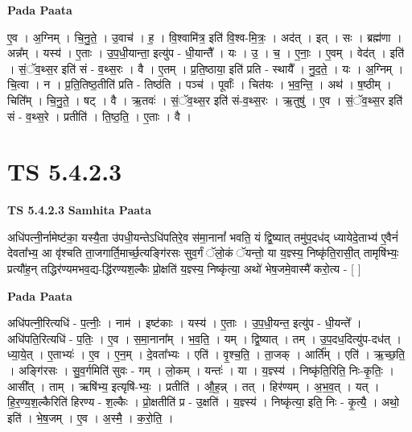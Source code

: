 \documentclass[17pt]{extarticle}
\begin{document}
\textbf{Pada Paata} \newline

ए॒व । अ॒ग्निम् । चि॒नु॒ते॒ । उ॒वाच॑ । ह॒ । वि॒श्वामि॑त्र॒ इति॑ वि॒श्व-मि॒त्रः॒ । अद॑त् । इत् । सः । ब्रह्म॑णा । अन्न᳚म् । यस्य॑ । ए॒ताः । उ॒प॒धी॒यान्ता॒ इत्यु॑प - धी॒यान्तै᳚ । यः । उ॒ । च॒ । ए॒नाः॒ । ए॒वम् । वेद॑त् । इति॑ । सं॒ॅव॒थ्स॒र इति॑ सं - व॒थ्स॒रः । वै । ए॒तम् । प्र॒ति॒ष्ठाया॒ इति॑ प्रति - स्थायै᳚ । नु॒द॒ते॒ । यः । अ॒ग्निम् । चि॒त्वा । न । प्र॒ति॒तिष्ठ॒तीति॑ प्रति - तिष्ठ॑ति । पञ्च॑ । पूर्वाः᳚ । चित॑यः । भ॒व॒न्ति॒ । अथ॑ । ष॒ष्ठीम् । चिति᳚म् । चि॒नु॒ते॒ । षट् । वै । ऋ॒तवः॑ । सं॒ॅव॒थ्स॒र इति॑ सं-व॒थ्स॒रः । ऋ॒तुषु॑ । ए॒व । सं॒ॅव॒थ्स॒र इति॑ सं - व॒थ्स॒रे । प्रतीति॑ । ति॒ष्ठ॒ति॒ । ए॒ताः । वै ।  \newline




\section*{ TS 5.4.2.3 }

\textbf{TS 5.4.2.3 } \newline
\textbf{Samhita Paata} \newline

अधि॑पत्नी॒र्नामेष्ट॑का॒ यस्यै॒ता उ॑पधी॒यन्तेऽधि॑पतिरे॒व स॑मा॒नानां᳚ भवति॒ यं द्वि॒ष्यात् तमु॑प॒दध॑द् ध्यायेदे॒ताभ्य॑ ए॒वैनं॑ देवता᳚भ्य॒ आ वृ॑श्चति ता॒जगार्ति॒मार्च्छ॒त्यङ्गि॑रसः सुव॒र्गं ॅलो॒कं ॅयन्तो॒ या य॒ज्ञ्स्य॒ निष्कृ॑ति॒रासी॒त् तामृषि॑भ्यः॒ प्रत्यौ॑ह॒न् तद्धिर॑ण्यमभव॒द्य-द्धि॑रण्यश॒ल्कैः प्रो॒क्षति॑ य॒ज्ञ्स्य॒ निष्कृ॑त्या॒ अथो॑ भेष॒जमे॒वास्मै॑ करो॒त्य - [  ] \newline

\textbf{Pada Paata} \newline

अधि॑पत्नी॒रित्यधि॑ - प॒त्नीः॒ । नाम॑ । इष्ट॑काः । यस्य॑ । ए॒ताः । उ॒प॒धी॒यन्त॒ इत्यु॑प - धी॒यन्ते᳚ । अधि॑पति॒रित्यधि॑ - प॒तिः॒ । ए॒व । स॒मा॒नाना᳚म् । भ॒व॒ति॒ । यम् । द्वि॒ष्यात् । तम् । उ॒प॒दध॒दित्यु॑प-दध॑त् । ध्या॒ये॒त् । ए॒ताभ्यः॑ । ए॒व । ए॒न॒म् । दे॒वता᳚भ्यः । एति॑ । वृ॒श्च॒ति॒ । ता॒जक् । आर्ति᳚म् । एति॑ । ऋ॒च्छ॒ति॒ । अङ्गि॑रसः । सु॒व॒र्गमिति॑ सुवः - गम् । लो॒कम् । यन्तः॑ । या । य॒ज्ञ्स्य॑ । निष्कृ॑ति॒रिति॒ निः-कृ॒तिः॒ । आसी᳚त् । ताम् । ऋषि॑भ्य॒ इत्यृषि॑-भ्यः॒ । प्रतीति॑ । औ॒ह॒न्न् । तत् । हिर॑ण्यम् । अ॒भ॒व॒त् । यत् । हि॒र॒ण्य॒श॒ल्कैरिति॑ हिरण्य - श॒ल्कैः । प्रो॒क्षतीति॑ प्र - उ॒क्षति॑ । य॒ज्ञ्स्य॑ । निष्कृ॑त्या॒ इति॒ निः - कृ॒त्यै॒ । अथो॒ इति॑ । भे॒ष॒जम् । ए॒व । अ॒स्मै॒ । क॒रो॒ति॒ ।  \newline
\end{document}
